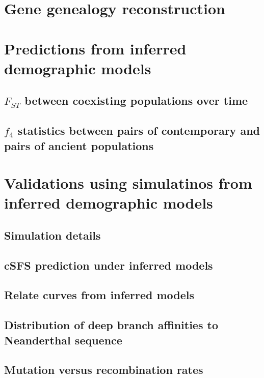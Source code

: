 \documentclass[]{article}
\begin{document}
\section{Gene genealogy reconstruction}

\section{Predictions from inferred demographic models}

\subsection{$F_{ST}$ between coexisting populations over time}

\subsection{$f_4$ statistics between pairs of contemporary and pairs of ancient populations}

\section{Validations using simulatinos from inferred demographic models}

\subsection{Simulation details}

\subsection{cSFS prediction under inferred models}

\subsection{Relate curves from inferred models}

\subsection{Distribution of deep branch affinities to Neanderthal sequence}

\subsection{Mutation versus recombination rates}

\break
\end{document}
